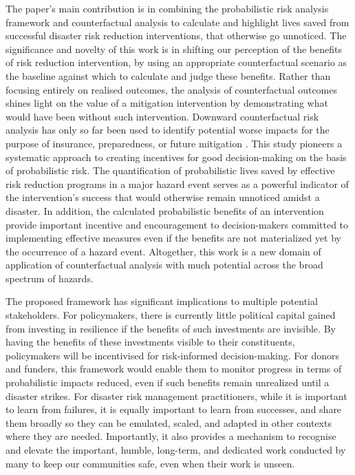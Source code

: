 \documentclass[utf8]{frontiersSCNS} %
\begin{document}
The paper’s main contribution is in combining the probabilistic risk analysis framework and counterfactual analysis to calculate and highlight lives saved from successful disaster risk reduction interventions, that otherwise go unnoticed. The significance and novelty of this work is in shifting our perception of the benefits of risk reduction intervention, by using an appropriate counterfactual scenario as the baseline against which to calculate and judge these benefits. Rather than focusing entirely on realised outcomes, the analysis of counterfactual outcomes shines light on the value of a mitigation intervention by demonstrating what would have been without such intervention. Downward counterfactual risk analysis has only so far been used to identify potential worse impacts for the purpose of insurance, preparedness, or future mitigation \citep[e.g.][]{lin2020modeling, aspinall2019counterfactual, woo2019downward, woo2018counterfactual, shepherd2018storylines, woo2017reimagining, oughton2019stochastic, aspinall2019counterfactual}. This study pioneers a systematic approach to creating incentives for good decision-making on the basis of probabilistic risk. The quantification of probabilistic lives saved by effective risk reduction programs in a major hazard event serves as a powerful indicator of the intervention's success that would otherwise remain unnoticed amidst a disaster. In addition, the calculated probabilistic benefits of an intervention provide important incentive and encouragement to decision-makers committed to implementing effective measures even if the benefits are not materialized yet by the occurrence of a hazard event. Altogether, this work is a new domain of application of counterfactual analysis with much potential across the broad spectrum of hazards. 

The proposed framework has significant implications to multiple potential stakeholders. For policymakers, there is currently little political capital gained from investing in resilience if the benefits of such investments are invisible. By having the benefits of these investments visible to their constituents, policymakers will be incentivised for risk-informed decision-making. For donors and funders, this framework would enable them to monitor progress in terms of probabilistic impacts reduced, even if such benefits remain unrealized until a disaster strikes. For disaster risk management practitioners, while it is important to learn from failures, it is equally important to learn from successes, and share them broadly so they can be emulated, scaled, and adapted in other contexts where they are needed. Importantly, it also provides a mechanism to recognise and elevate the important, humble, long-term, and dedicated work conducted by many to keep our communities safe, even when their work is unseen.
\end{document}
